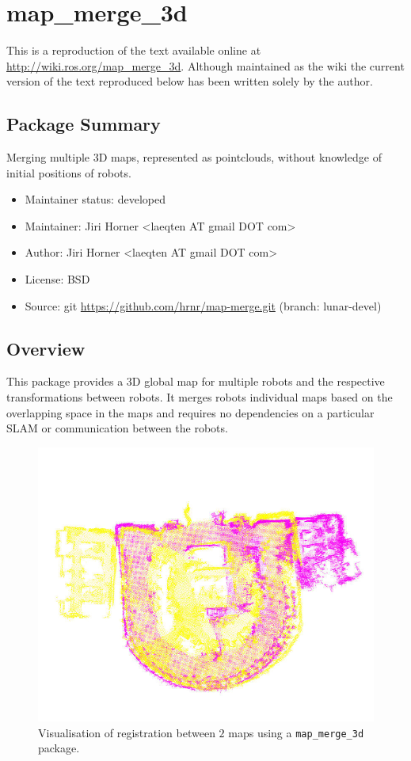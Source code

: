 \chapter{map\_merge\_3d}
\label{chap:map_merge-wiki}

This is a reproduction of the text available online at \url{http://wiki.ros.org/map_merge_3d}. Although maintained as the wiki the current version of the text reproduced below has been written solely by the author.

\section{Package Summary}

Merging multiple 3D maps, represented as pointclouds, without knowledge of initial positions of robots.

\begin{itemize}
    \item Maintainer status: developed
    \item Maintainer: Jiri Horner \textless laeqten AT gmail DOT com\textgreater
    \item Author: Jiri Horner \textless laeqten AT gmail DOT com\textgreater
    \item License: BSD
    \item Source: git \url{https://github.com/hrnr/map-merge.git} (branch: lunar-devel)
\end{itemize}


\section{Overview}

This package provides a 3D global map for multiple robots and the respective transformations between robots. It merges robots individual maps based on the overlapping space in the maps and requires no dependencies on a particular SLAM or communication between the robots.

\begin{figure}
    \centering
    \includegraphics[width=4.53in]{../img/screenshot.jpg}
    \caption[The merged map for $2$ robots.]{Visualisation of registration between $2$ maps using a \texttt{map\_merge\_3d} package.}
    \label{fig:mapmergescreenshot}
\end{figure}

